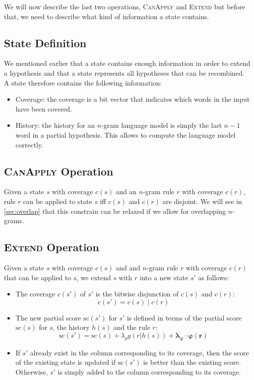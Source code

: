 We will now describe the last two operations, \textsc{CanApply}
and \textsc{Extend} but before that, we need to describe what kind
of information a state contains.

\subsection{State Definition}

We mentioned earlier that a state contains enough information
in order to extend a hypothesis and that a state represents
all hypotheses that can be recombined. A state therefore
contains the following information:
%
\begin{itemize}
  \item Coverage: the coverage is a bit vector that indicates
    which words in the input have been covered.
  \item History: the history for an $n$-gram language model
    is simply the last $n-1$ word in a partial hypothesis.
    This allows to compute the language model correctly.
\end{itemize}

\subsection{\textsc{CanApply} Operation}
\label{sec:canApply}

Given a state $s$ with coverage $c(s)$ and an $n$-gram rule $r$ with
coverage $c(r)$, rule $r$ can be applied to state $s$ iff $c(s)$ and
$c(r)$ are disjoint. We will see in \autoref{sec:overlap}
that this constrain can be relaxed if we allow for overlapping
$n$-grams.

\subsection{\textsc{Extend} Operation}

Given a state $s$ with coverage $c(s)$ and and $n$-gram rule $r$
with coverage $c(r)$ that can be applied to $s$, we extend
$s$ with $r$ into a new state $s'$ as follows:
%
\begin{itemize}
  \item The coverage $c(s')$ of $s'$ is the bitwise disjunction
    of $c(s)$ and $c(r)$:
%
\begin{equation}
  c(s') = c(s) \mid c(r)
\end{equation}
%
  \item The new partial score $\text{sc}(s')$ for $s'$ is defined in terms
    of the partial score $\text{sc}(s)$ for $s$, the history $h(s)$ and the rule $r$:
%
\begin{equation}
  \text{sc}(s') = \text{sc}(s) + \lambda_g g(r | h(s)) + \bm{\lambda_{\varphi}} \cdot \bm{\varphi(r)}
\end{equation}
%
  \item If $s'$ already exist in the column corresponding to its coverage, then
    the score of the existing state is updated if $\text{sc}(s')$ is better than
    the existing score. Otherwise, $s'$ is simply added to the column corresponding
    to its coverage.
\end{itemize}

